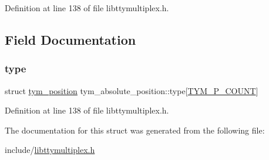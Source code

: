 Definition at line 138 of file libttymultiplex.\+h.



\subsection{Field Documentation}
\mbox{\label{structtym__absolute__position_ad80b2993d316f7f166dc1761c1ae65b2}} 
\subsubsection{\texorpdfstring{type}{type}}
{\footnotesize\ttfamily struct \hyperlink{structtym__position}{tym\+\_\+position} tym\+\_\+absolute\+\_\+position\+::type\mbox{[}\hyperlink{libttymultiplex_8h_a23b539c9dc1c137633f8783517fc2653a483bfa59d0a2b43731d992c418a42db7}{T\+Y\+M\+\_\+\+P\+\_\+\+C\+O\+U\+NT}\mbox{]}}



Definition at line 138 of file libttymultiplex.\+h.



The documentation for this struct was generated from the following file\+:\begin{DoxyCompactItemize}
\item 
include/\hyperlink{libttymultiplex_8h}{libttymultiplex.\+h}\end{DoxyCompactItemize}
